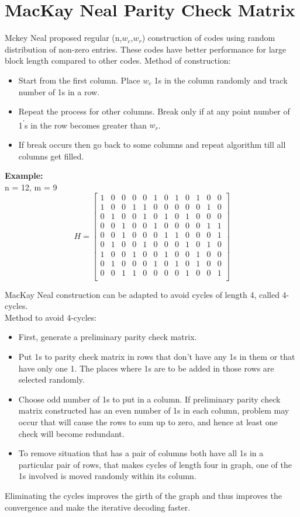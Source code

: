 \section{MacKay Neal Parity Check Matrix}
Mckey Neal proposed regular (n,$w_c$,$w_r$) construction of codes using random distribution of non-zero entries\cite{2}. These codes have better performance for large block length compared to other codes.
Method of construction:
\begin{itemize} 
\item Start from the first column. Place $w_c$ 1s in the column randomly and track number of 1s in a row.
\item Repeat the process for other columns. Break only if at any point number of 1\textsuperscript{'}s in the row becomes greater than $w_r$.
\item If break occurs then go back to some columns and repeat algorithm till all columns get filled.
\end{itemize} 
\textbf{Example:}\\
 n = 12, m = 9  
  \[H=
 \left[ \begin{array}{cccccccccccc}
1 & 0 & 0 & 0 & 0 & 1 & 0 & 1 & 0 & 1 & 0 & 0 \\
1 & 0 & 0 & 1 & 1 & 0 & 0 & 0 & 0 & 0 & 1 & 0 \\
0 & 1 & 0 & 0 & 1 & 0 & 1 & 0 & 1 & 0 & 0 & 0 \\
0 & 0 & 1 & 0 & 0 & 1 & 0 & 0 & 0 & 0 & 1 & 1 \\
0 & 0 & 1 & 0 & 0 & 0 & 1 & 1 & 0 & 0 & 0 & 1 \\
0 & 1 & 0 & 0 & 1 & 0 & 0 & 0 & 1 & 0 & 1 & 0\\
1 & 0 & 0 & 1 & 0 & 0 & 1 & 0 & 0 & 1 & 0 & 0 \\
0 & 1 & 0 & 0 & 0 & 1 & 0 & 1 & 0 & 1 & 0 & 0 \\
0 & 0 & 1 & 1 & 0 & 0 & 0 & 0 & 1 & 0 & 0 & 1 \\ \end{array} \right]  
\] 

MacKay Neal construction can be adapted to avoid cycles of length 4, called 4-cycles.\\
Method to avoid 4-cycles\cite{7}:
\begin{itemize}
\item First, generate a preliminary parity check matrix.
\item Put 1s to parity check matrix in rows that don't have any 1s in them or that have only one 1. The places where 1s are to be added in those rows are selected randomly. 
\item Choose odd number of 1s to put in a column. If preliminary parity check matrix constructed has an even number of 1s in each column, problem may occur that will cause the rows to sum up to zero, and hence at least one check will become redundant.
\item To remove situation that has a pair of columns both have all 1s in a particular pair of rows, that makes cycles of length four in graph, one of the 1s involved is moved randomly within its column.
\end{itemize}
Eliminating the cycles improves the girth of the graph and thus improves the convergence and make the iterative decoding faster.  
